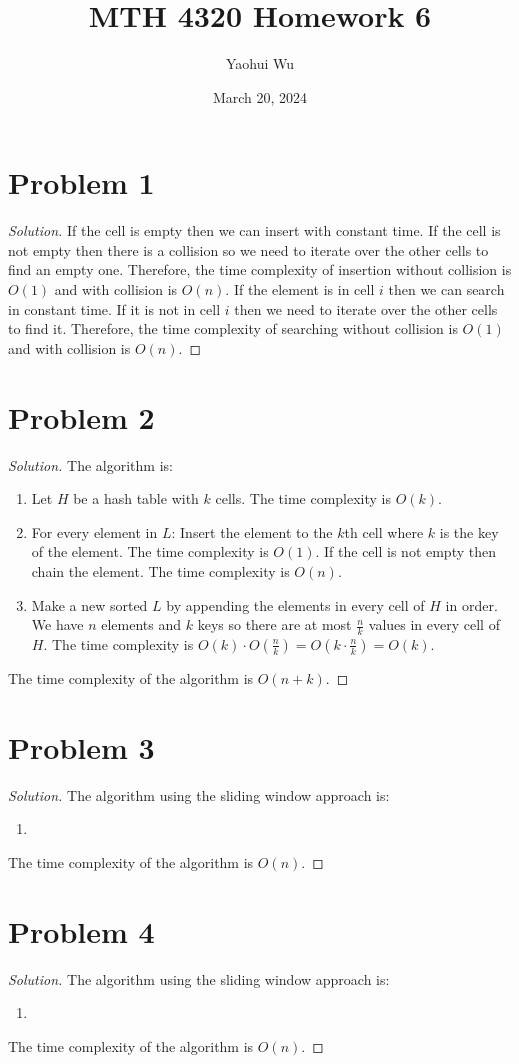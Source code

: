 \documentclass[12pt]{article}
\title{MTH 4320 Homework 6}
\author{Yaohui Wu}
\date{March 20, 2024}
\newenvironment*{solution}{\begin{proof}[Solution]}{\end{proof}}
\begin{document}
\maketitle
\section*{Problem 1}
\begin{solution}
    If the cell is empty then we can insert with constant time. If the cell is
    not empty then there is a collision so we need to iterate over the other
    cells to find an empty one. Therefore, the time complexity of insertion
    without collision is \(O(1)\) and with collision is \(O(n)\). If the
    element is in cell \(i\) then we can search in constant time. If it is not
    in cell \(i\) then we need to iterate over the other cells to find it.
    Therefore, the time complexity of searching without collision is \(O(1)\)
    and with collision is \(O(n)\).
\end{solution}
\section*{Problem 2}
\begin{solution}
    The algorithm is:
    \begin{enumerate}
        \item Let \(H\) be a hash table with \(k\) cells. The time complexity
        is \(O(k)\).
        \item For every element in \(L\): Insert the element to the \(k\)th
        cell where \(k\) is the key of the element. The time complexity is
        \(O(1)\). If the cell is not empty then chain the element. The time
        complexity is \(O(n)\).
        \item Make a new sorted \(L\) by appending the elements in every cell
        of \(H\) in order. We have \(n\) elements and \(k\) keys so there are
        at most \(\frac{n}{k}\) values in every cell of \(H\). The time
        complexity is \(O(k)\cdot O(\frac{n}{k})=O(k\cdot\frac{n}{k})=O(k)\).
    \end{enumerate}
    The time complexity of the algorithm is \(O(n+k)\).
\end{solution}
\section*{Problem 3}
\begin{solution}
    The algorithm using the sliding window approach is:
    \begin{enumerate}
        \item 
    \end{enumerate}
    The time complexity of the algorithm is \(O(n)\).
\end{solution}
\section*{Problem 4}
\begin{solution}
    The algorithm using the sliding window approach is:
    \begin{enumerate}
        \item 
    \end{enumerate}
    The time complexity of the algorithm is \(O(n)\).
\end{solution}
\end{document}

